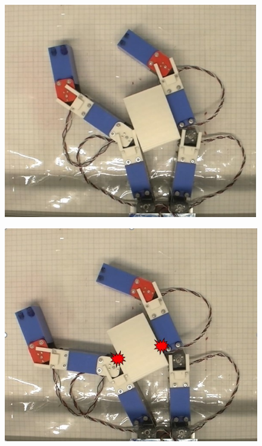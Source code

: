 \documentclass[a4paper,twoside,12pt,papersize, dvipdfmx]{iirthesis}
\begin{document}
\begin{figure}[b]
	\centering
	\begin{minipage}{0.33\hsize}
	\includegraphics[width=0.9\hsize]{fig/2-sensorless-icm/jam1.jpg}
	\label{fig::sicm::beforejam}
	\end{minipage}\hfill
	\begin{minipage}{0.33\hsize}
	\includegraphics[width=0.9\hsize]{fig/2-sensorless-icm/jam2.jpg}
	\label{fig::sicm::justjam}
	\end{minipage}\hfill
	\begin{minipage}{0.33\hsize}

\end{minipage}
\end{figure}
\end{document}
